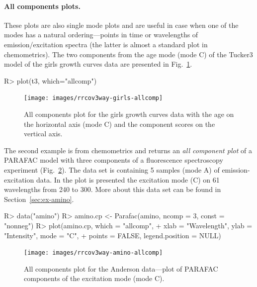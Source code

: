 \documentclass[article,shortnames, nojss]{jss}
\begin{document}
\paragraph{All components plots.} These plots are also single mode plots and
are useful in case when one of the modes has a natural ordering---points
in time or wavelengths of emission/excitation spectra (the latter is
almost a standard plot in chemometrics). The two components from the
age mode (mode C) of the Tucker3 model of the girls growth curves data are presented
in Fig.~\ref{fig-girls-allcomp}.
\begin{Schunk}
\begin{Sinput}
R> plot(t3, which="allcomp")
\end{Sinput}
\end{Schunk}
\begin{figure}[H]
\centering
\texttt{[image: images/rrcov3way-girls-allcomp]}
\caption{All components plot for the girls growth curves data with the age
on the horizontal axis (mode C) and the component scores on the vertical axis.}
\label{fig-girls-allcomp}
\end{figure}
The second example is from chemometrics
and returns an \emph{all component plot} of a
PARAFAC model with three components of a fluorescence spectroscopy
experiment (Fig.~\ref{fig-amino-allcomp}). The data set is  containing 5 samples (mode A) of
emission-excitation data. In the plot is presented the excitation mode (C)
on 61 wavelengths from 240 to 300. More about this data set can be found
in Section~\ref{sec:ex-amino}.
\begin{Schunk}
\begin{Sinput}
R> data("amino")
R> amino.cp <- Parafac(amino, ncomp = 3, const = "nonneg")
R> plot(amino.cp, which = "allcomp",
+      xlab = "Wavelength", ylab = "Intensity", mode = "C",
+      points = FALSE, legend.position = NULL)
\end{Sinput}
\end{Schunk}
\begin{figure}
\centering
\texttt{[image: images/rrcov3way-amino-allcomp]}
\caption{All components plot for the Anderson data---plot of PARAFAC
components of the excitation mode (mode C).}
\label{fig-amino-allcomp}
\end{figure}

\end{document}
